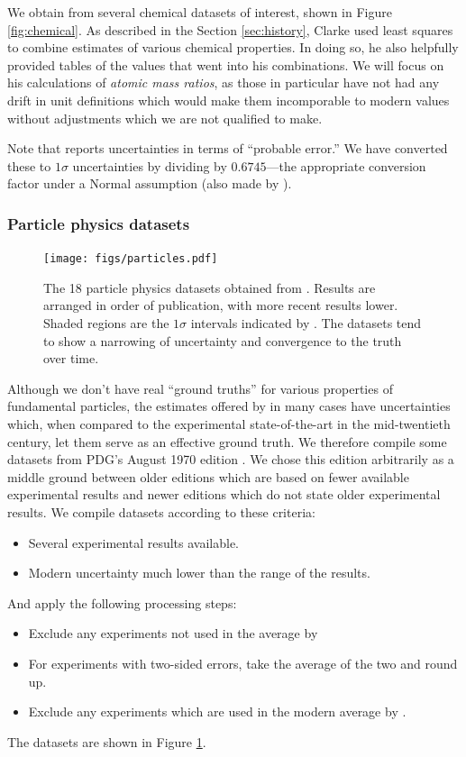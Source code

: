 \documentclass[12pt]{article}
\begin{document}
We obtain from \citet{clarke1910recalculation} several chemical datasets of interest, shown in Figure \ref{fig:chemical}. As described in the Section \ref{sec:history}, Clarke used least squares to combine estimates of various chemical properties. In doing so, he also helpfully provided tables of the values that went into his combinations. We will focus on his calculations of \textit{atomic mass ratios}, as those in particular have not had any drift in unit definitions which would make them incomporable to modern values without adjustments which we are not qualified to make.

Note that \citet{clarke1910recalculation} reports uncertainties in terms of ``probable error.'' We have converted these to $1\sigma$ uncertainties by dividing by $0.6745$---the appropriate conversion factor under a Normal assumption (also made by \citet{clarke1910recalculation}).

\subsubsection{Particle physics datasets}

\begin{figure}
  \texttt{[image: figs/particles.pdf]}
  \caption{The 18 particle physics datasets obtained from \citet{roos1970review}. Results are arranged in order of publication, with more recent results lower. Shaded regions are the $1\sigma$ intervals indicated by \citet{navas2024review}. The datasets tend to show a narrowing of uncertainty and convergence to the truth over time.}
  \label{fig:particle}
\end{figure}

Although we don't have real ``ground truths'' for various properties of fundamental particles, the estimates offered by \citet{navas2024review} in many cases have uncertainties which, when compared to the experimental state-of-the-art in the mid-twentieth century, let them serve as an effective ground truth. We therefore compile some datasets from PDG's August 1970 edition \citet{roos1970review}. We chose this edition arbitrarily as a middle ground between older editions which are based on fewer available experimental results and newer editions which do not state older experimental results. We compile datasets according to these criteria:
\begin{itemize}
  \item Several experimental results available.
  \item Modern uncertainty much lower than the range of the results.
\end{itemize}
And apply the following processing steps:
\begin{itemize}
  \item Exclude any experiments not used in the average by \citet{roos1970review}
  \item For experiments with two-sided errors, take the average of the two and round up.
  \item Exclude any experiments which are used in the modern average by \citet{navas2024review}.
\end{itemize}
The datasets are shown in Figure \ref{fig:particle}.
\end{document}
